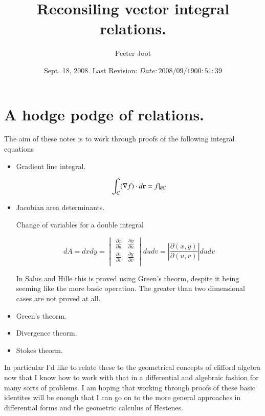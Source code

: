 \documentclass{article}
\title{ Reconsiling vector integral relations. }
\author{Peeter Joot}
\date{ Sept. 18, 2008.  Last Revision: $Date: 2008/09/19 00:51:39 $ }
\newcommand{\grad}[0]{\nabla}
\newcommand{\PD}[2]{\frac{\partial {#2}}{\partial {#1}}}
\newcommand{\Abs}[1]{\left\lvert{#1}\right\rvert}
\begin{document}
\maketitle{}

\tableofcontents

\section{ A hodge podge of relations. }


The aim of these notes is to work through proofs of the following 
integral equations

\begin{itemize}

\item Gradient line integral. 

\begin{equation}\label{eqn:lineintegral}
\int_C (\grad f) \cdot d\Br = f \vert_{\partial C}
\end{equation}

\item Jacobian area determinants. 

Change of variables for a double integral

\begin{equation}
dA = dx dy =
\begin{vmatrix}
\PD{u}{x} & \PD{u}{y} \\
\PD{v}{x} & \PD{v}{y} \\
\end{vmatrix}
du dv
= \Abs{ \PD{(u,v)}{(x,y)} } du dv
\end{equation}

In Salus and Hille this is proved using Green's theorm, despite it 
being seeming like the more basic operation.  The greater than two
dimensional cases are not proved at all.

\item Green's theorm. 

\item Divergence theorm. 

\item Stokes theorm. 
\end{itemize}

In particular I'd like to relate these to the geometrical concepts
of clifford algebra now that I know how to work with that in a 
differential and algebraic fashion for many sorts of problems.  I am hoping
that working through proofs of these basic identites 
will be enough that I can go on to the more general approaches in 
differential forms and the geometric calculus of Hestenes.
\end{document}
